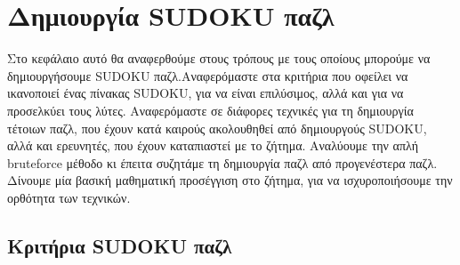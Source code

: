 \documentclass[12pt]{book}
\theoremstyle{definition}
\begin{document}
\chapter{Δημιουργία SUDOKU παζλ}

Στο κεφάλαιο αυτό θα αναφερθούμε στους τρόπους με τους οποίους μπορούμε να δημιουργήσουμε SUDOKU παζλ.Αναφερόμαστε στα κριτήρια που οφείλει να ικανοποιεί ένας πίνακας SUDOKU, για να είναι επιλύσιμος, αλλά και για να προσελκύει τους λύτες. Αναφερόμαστε σε διάφορες τεχνικές για τη δημιουργία τέτοιων παζλ, που έχουν κατά καιρούς ακολουθηθεί από δημιουργούς SUDOKU, αλλά και ερευνητές, που έχουν καταπιαστεί με το ζήτημα. Αναλύουμε την απλή bruteforce μέθοδο κι έπειτα συζητάμε τη δημιουργία παζλ από προγενέστερα παζλ. Δίνουμε μία βασική μαθηματική προσέγγιση στο ζήτημα, για να ισχυροποιήσουμε την ορθότητα των τεχνικών. \par

\section{Κριτήρια SUDOKU παζλ}
\end{document}

